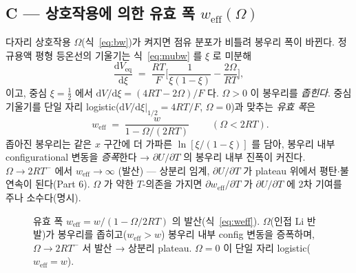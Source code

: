 \documentclass[11pt,a4paper]{article}
\newcommand{\dd}{\mathrm{d}}
\newcommand{\eq}{\mathrm{eq}}
\newcommand{\eff}{\mathrm{eff}}
\begin{document}
\subsection{C — 상호작용에 의한 유효 폭 $w_\eff(\Omega)$}\label{sec:weffC}
다자리 상호작용 $\Omega$(식~\eqref{eq:bw})가 켜지면 점유 분포가 비틀려 봉우리 폭이 바뀐다. 정규용액
평형 등온선의 기울기는 식~\eqref{eq:mubw} 를 $\xi$ 로 미분해
\begin{equation}
\frac{\dd V_\eq}{\dd\xi}
  \;=\; \frac{RT}{F}\Big[\frac{1}{\xi(1-\xi)}-\frac{2\Omega}{RT}\Big],
\label{eq:dVdxi}
\end{equation}
이고, 중심 $\xi=\tfrac12$ 에서 $\dd V/\dd\xi=(4RT-2\Omega)/F$ 다. $\Omega>0$ 이 봉우리를 \emph{좁힌다}.
중심 기울기를 단일 자리 logistic($\dd V/\dd\xi|_{1/2}=4RT/F$, $\Omega{=}0$)과 맞추는 \emph{유효 폭}은
\begin{equation}
\boxed{\;
w_\eff \;=\; \frac{w}{1-\Omega/(2RT)}
\;}
\qquad(\Omega<2RT).
\label{eq:weff}
\end{equation}
좁아진 봉우리는 같은 $x$ 구간에 더 가파른 $\ln[\xi/(1-\xi)]$ 를 담아, 봉우리 내부 configurational 변동을
\emph{증폭}한다 → $\partial U/\partial T$ 의 봉우리 내부 진폭이 커진다. $\Omega\to2RT^-$ 에서 $w_\eff\to\infty$
(발산) — 상분리 임계, $\partial U/\partial T$ 가 plateau 위에서 평탄$\cdot$불연속이 된다(Part 6). $\Omega$ 가
약한 $T$-의존을 가지면 $\partial w_\eff/\partial T$ 가 $\partial U/\partial T$ 에 2차 기여를 주나 소수다(명시).

\begin{figure}[t]
\centering
{}
\caption{유효 폭 $w_\mathrm{eff}=w/(1-\Omega/2RT)$ 의 발산(식~\eqref{eq:weff}). $\Omega$(인접 Li 반발)가
봉우리를 좁히고($w_\mathrm{eff}>w$) 봉우리 내부 config 변동을 증폭하며, $\Omega\to2RT^-$ 서 발산 → 상분리
plateau. $\Omega=0$ 이 단일 자리 logistic($w_\mathrm{eff}=w$).}
\label{fig:weff}
\end{figure}
\end{document}
